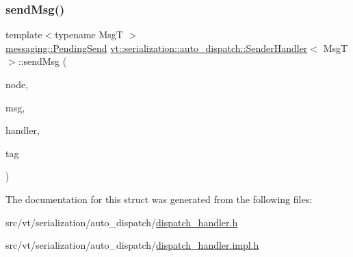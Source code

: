 \subsubsection{\texorpdfstring{send\+Msg()}{sendMsg()}}
{\footnotesize\ttfamily template$<$typename MsgT $>$ \\
\hyperlink{structvt_1_1messaging_1_1_pending_send}{messaging\+::\+Pending\+Send} \hyperlink{structvt_1_1serialization_1_1auto__dispatch_1_1_sender_handler}{vt\+::serialization\+::auto\+\_\+dispatch\+::\+Sender\+Handler}$<$ MsgT $>$\+::send\+Msg (\begin{DoxyParamCaption}\item[{\hyperlink{namespacevt_a866da9d0efc19c0a1ce79e9e492f47e2}{Node\+Type} const \&}]{node,  }\item[{MsgT $\ast$}]{msg,  }\item[{\hyperlink{namespacevt_af64846b57dfcaf104da3ef6967917573}{Handler\+Type} const \&}]{handler,  }\item[{\hyperlink{namespacevt_a84ab281dae04a52a4b243d6bf62d0e52}{Tag\+Type} const \&}]{tag }\end{DoxyParamCaption})\hspace{0.3cm}{\ttfamily [static]}}



The documentation for this struct was generated from the following files\+:\begin{DoxyCompactItemize}
\item 
src/vt/serialization/auto\+\_\+dispatch/\hyperlink{dispatch__handler_8h}{dispatch\+\_\+handler.\+h}\item 
src/vt/serialization/auto\+\_\+dispatch/\hyperlink{dispatch__handler_8impl_8h}{dispatch\+\_\+handler.\+impl.\+h}\end{DoxyCompactItemize}
